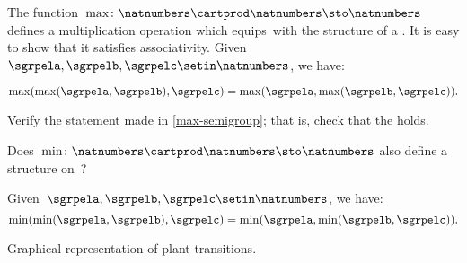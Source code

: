 \begin{example}
    \label{max-semigroup}

    The function~$\max \colon \natnumbers \cartprod \natnumbers \sto \natnumbers$ defines a multiplication operation which equips~\natnumbers with the structure of a .
    It is easy to show that it satisfies associativity.
    Given~$\sgrpela,\sgrpelb,\sgrpelc\setin \natnumbers$, we have:

    \begin{equation}
        \label{eq:max-assoc}
        \max(\max(\sgrpela,\sgrpelb),\sgrpelc)
        =
        \max(\sgrpela,\max(\sgrpelb,\sgrpelc)).
    \end{equation}
\end{example}

\begin{exercise}
    \label{ex:max-semigroup}
    Verify the statement made in \cref{max-semigroup}; that is, check that the  holds.

    Does~$\min \colon \natnumbers \cartprod \natnumbers \sto \natnumbers$ also define a  structure on~\natnumbers ?
\end{exercise}
\begin{solution}
    Given~$\sgrpela,\sgrpelb,\sgrpelc\setin \natnumbers$, we have:
    \begin{equation}
        \label{eq:min-assoc}
        \min(\min(\sgrpela,\sgrpelb),\sgrpelc)=\min(\sgrpela,\min(\sgrpelb,\sgrpelc)).
    \end{equation}
\end{solution}

\begin{marginfigure}
    \centering
    \caption{Graphical representation of plant transitions.}
    \label{fig:plants_transitions}
\end{marginfigure}

